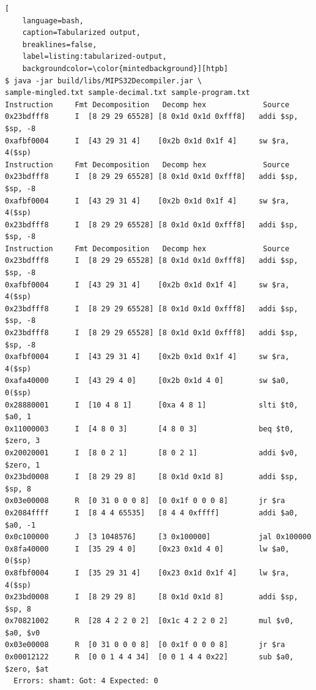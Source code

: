 \documentclass[a4paper]{article}
\begin{document}
\begin{landscape}
\begin{minipage}{\linewidth}
\thispagestyle{empty}
\begin{lstlisting}[ 
    language=bash, 
    caption=Tabularized output,
    breaklines=false,
    label=listing:tabularized-output,
    backgroundcolor=\color{mintedbackground}][htpb]
$ java -jar build/libs/MIPS32Decompiler.jar \
sample-mingled.txt sample-decimal.txt sample-program.txt
Instruction     Fmt Decomposition   Decomp hex             Source            
0x23bdfff8      I  [8 29 29 65528] [8 0x1d 0x1d 0xfff8]   addi $sp, $sp, -8 
0xafbf0004      I  [43 29 31 4]    [0x2b 0x1d 0x1f 4]     sw $ra, 4($sp)    
Instruction     Fmt Decomposition   Decomp hex             Source            
0x23bdfff8      I  [8 29 29 65528] [8 0x1d 0x1d 0xfff8]   addi $sp, $sp, -8 
0xafbf0004      I  [43 29 31 4]    [0x2b 0x1d 0x1f 4]     sw $ra, 4($sp)    
0x23bdfff8      I  [8 29 29 65528] [8 0x1d 0x1d 0xfff8]   addi $sp, $sp, -8 
Instruction     Fmt Decomposition   Decomp hex             Source            
0x23bdfff8      I  [8 29 29 65528] [8 0x1d 0x1d 0xfff8]   addi $sp, $sp, -8 
0xafbf0004      I  [43 29 31 4]    [0x2b 0x1d 0x1f 4]     sw $ra, 4($sp)    
0x23bdfff8      I  [8 29 29 65528] [8 0x1d 0x1d 0xfff8]   addi $sp, $sp, -8 
0x23bdfff8      I  [8 29 29 65528] [8 0x1d 0x1d 0xfff8]   addi $sp, $sp, -8 
0xafbf0004      I  [43 29 31 4]    [0x2b 0x1d 0x1f 4]     sw $ra, 4($sp)    
0xafa40000      I  [43 29 4 0]     [0x2b 0x1d 4 0]        sw $a0, 0($sp)    
0x28880001      I  [10 4 8 1]      [0xa 4 8 1]            slti $t0, $a0, 1  
0x11000003      I  [4 8 0 3]       [4 8 0 3]              beq $t0, $zero, 3 
0x20020001      I  [8 0 2 1]       [8 0 2 1]              addi $v0, $zero, 1
0x23bd0008      I  [8 29 29 8]     [8 0x1d 0x1d 8]        addi $sp, $sp, 8  
0x03e00008      R  [0 31 0 0 0 8]  [0 0x1f 0 0 0 8]       jr $ra            
0x2084ffff      I  [8 4 4 65535]   [8 4 4 0xffff]         addi $a0, $a0, -1 
0x0c100000      J  [3 1048576]     [3 0x100000]           jal 0x100000      
0x8fa40000      I  [35 29 4 0]     [0x23 0x1d 4 0]        lw $a0, 0($sp)    
0x8fbf0004      I  [35 29 31 4]    [0x23 0x1d 0x1f 4]     lw $ra, 4($sp)    
0x23bd0008      I  [8 29 29 8]     [8 0x1d 0x1d 8]        addi $sp, $sp, 8  
0x70821002      R  [28 4 2 2 0 2]  [0x1c 4 2 2 0 2]       mul $v0, $a0, $v0 
0x03e00008      R  [0 31 0 0 0 8]  [0 0x1f 0 0 0 8]       jr $ra            
0x00012122      R  [0 0 1 4 4 34]  [0 0 1 4 4 0x22]       sub $a0, $zero, $at
  Errors: shamt: Got: 4 Expected: 0
\end{lstlisting}
\end{minipage}
\end{landscape}
\end{document}
